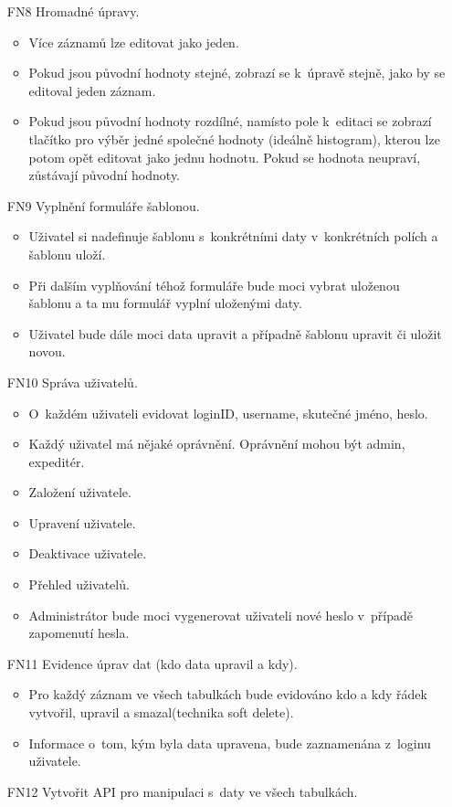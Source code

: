 \documentclass[thesis=B,czech]{FITthesis}[2012/06/26]
\begin{document}
\begin{enumerate}
	\item[FN8] Hromadné úpravy.
	\begin{itemize}
		\item Více záznamů lze editovat jako jeden. 
		\item Pokud jsou původní hodnoty stejné, zobrazí se k~úpravě stejně, jako by se editoval jeden záznam. 
		\item Pokud jsou původní hodnoty rozdílné, namísto pole k~editaci se zobrazí tlačítko pro výběr jedné společné hodnoty (ideálně histogram), kterou lze potom opět editovat jako jednu hodnotu. Pokud se hodnota neupraví, zůstávají původní hodnoty.
	\end{itemize}
	\item[FN9] Vyplnění formuláře šablonou.
	\begin{itemize}
		\item Uživatel si nadefinuje šablonu s~konkrétními daty v~konkrétních polích a šablonu uloží. 
		\item Při dalším vyplňování téhož formuláře bude moci vybrat uloženou šablonu a ta mu formulář vyplní uloženými daty. 
		\item Uživatel bude dále moci data upravit a případně šablonu upravit či uložit novou.
	\end{itemize}
	\item[FN10] Správa uživatelů.
	\begin{itemize}
		\item O~každém uživateli evidovat loginID, username, skutečné jméno, heslo.
		\item Každý uživatel má nějaké oprávnění. Oprávnění mohou být admin, expeditér.
		\item Založení uživatele.
		\item Upravení uživatele.
		\item Deaktivace uživatele.
		\item Přehled uživatelů.
		\item Administrátor bude moci vygenerovat uživateli nové heslo v~případě zapomenutí hesla.
	\end{itemize}
	\item[FN11] Evidence úprav dat (kdo data upravil a kdy).
	\begin{itemize}
		\item Pro každý záznam ve všech tabulkách bude evidováno kdo a kdy řádek vytvořil, upravil a smazal(technika soft delete).
		\item Informace o~tom, kým byla data upravena, bude zaznamenána z~loginu uživatele.	
	\end{itemize}
	\item[FN12] Vytvořit API pro manipulaci s~daty ve všech tabulkách.
\end{enumerate}
\end{document}
